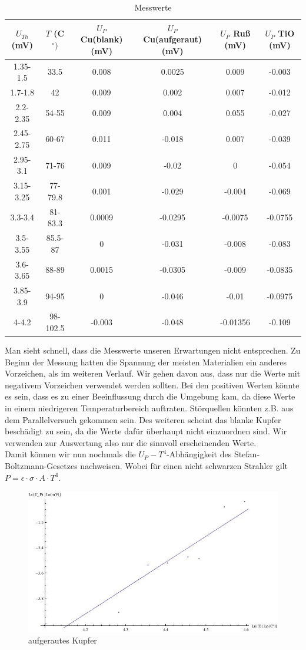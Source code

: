 \documentclass[12pt,twoside,a4paper]{article}
\begin{document}
\begin{table}[H]
\caption{Messwerte}
\tabcolsep=0.03cm
	\begin{tabular}{c|c|c|c|c|c}
   $U_{Th}$ (mV) & $T $ (C$^\circ) $  & $U_P$ Cu(blank) (mV) & $U_P$ Cu(aufgeraut) (mV) & $U_P$ Ruß (mV) & $U_P$ TiO (mV)\\
		\hline
		 1.35-1.5 & 33.5 & 0.008 & 0.0025 & 0.009 & -0.003\\
		 1.7-1.8 & 42 & 0.009 & 0.002 & 0.007 & -0.012\\
		 2.2-2.35 & 54-55 & 0.009 & 0.004 & 0.055 & -0.027\\
		 2.45-2.75 & 60-67 & 0.011 & -0.018 & 0.007 & -0.039\\
		 2.95-3.1 & 71-76 & 0.009 & -0.02 & 0 & -0.054\\
		 3.15-3.25 & 77-79.8 & 0.001 & -0.029 & -0.004 & -0.069\\
		 3.3-3.4 & 81-83.3 & 0.0009 & -0.0295 & -0.0075 & -0.0755\\
		 3.5-3.55 & 85.5-87 & 0 & -0.031 & -0.008 & -0.083\\
		 3.6-3.65 & 88-89 & 0.0015 & -0.0305 & -0.009 & -0.0835\\
		 3.85-3.9 & 94-95 & 0 & -0.046 & -0.01 & -0.0975\\
		 4-4.2 & 98-102.5 & -0.003 & -0.048 & -0.01356 & -0.109\\
	\end{tabular}
\end{table}
Man sieht schnell, dass die Messwerte unseren Erwartungen nicht entsprechen. Zu Beginn der Messung hatten die Spannung der meisten Materialien ein anderes Vorzeichen, als im weiteren Verlauf. Wir gehen davon aus, dass nur die Werte mit negativem Vorzeichen verwendet werden sollten. Bei den positiven Werten könnte es sein, dass es zu einer Beeinflussung durch die Umgebung kam, da diese Werte in einem niedrigeren Temperaturbereich auftraten. Störquellen könnten z.B. aus dem Parallelversuch gekommen sein. Des weiteren scheint das blanke Kupfer beschädigt zu sein, da die Werte dafür überhaupt nicht einzuordnen sind. Wir verwenden zur Auswertung also nur die sinnvoll erscheinenden Werte.\\
Damit können wir nun nochmals die $U_P-T^4$-Abhängigkeit des Stefan-Boltzmann-Gesetzes nachweisen. Wobei für einen nicht schwarzen Strahler gilt $P= \epsilon \cdot \sigma \cdot A \cdot T^4$.
\begin{figure}[H]
		\centering
		\includegraphics[scale=.6]{bilder/waerme_2_cu.jpeg} 
		\caption{aufgerautes Kupfer}
	\end{figure}
\end{document}
